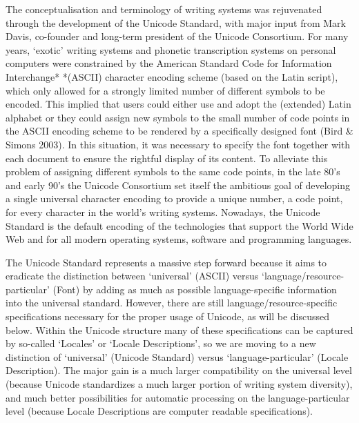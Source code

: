 {{{{{{{{{{The conceptualisation and terminology of writing systems was rejuvenated through the development of the Unicode Standard, with major input from Mark Davis, co-founder and long-term president of the Unicode Consortium. For many years, `exotic' writing systems and phonetic transcription systems on personal computers were constrained by the American Standard Code for Information Interchange* *(ASCII) character encoding scheme (based on the Latin script), which only allowed for a strongly limited number of different symbols to be encoded. This implied that users could either use and adopt the (extended) Latin alphabet or they could assign new symbols to the small number of code points in the ASCII encoding scheme to be rendered by a specifically designed font (Bird \& Simons 2003). In this situation, it was necessary to specify the font together with each document to ensure the rightful display of its content. To alleviate this problem of assigning different symbols to the same code points, in the late 80's and early 90's the Unicode Consortium set itself the ambitious goal of developing a single universal character encoding to provide a unique number, a code point, for every character in the world's writing systems. Nowadays, the Unicode Standard is the default encoding of the technologies that support the World Wide Web and for all modern operating systems, software and programming languages.

The Unicode Standard represents a massive step forward because it aims to eradicate the distinction between `universal' (ASCII) versus `language/resource-particular' (Font) by adding as much as possible language-specific information into the universal standard. However, there are still language/resource-specific specifications necessary for the proper usage of Unicode, as will be discussed below. Within the Unicode structure many of these specifications can be captured by so-called `Locales' or `Locale Descriptions', so we are moving to a new distinction of `universal' (Unicode Standard) versus `language-particular' (Locale Description). The major gain is a much larger compatibility on the universal level (because Unicode standardizes a much larger portion of writing system diversity), and much better possibilities for automatic processing on the language-particular level (because Locale Descriptions are computer readable specifications).

}}}}}}}}}}
